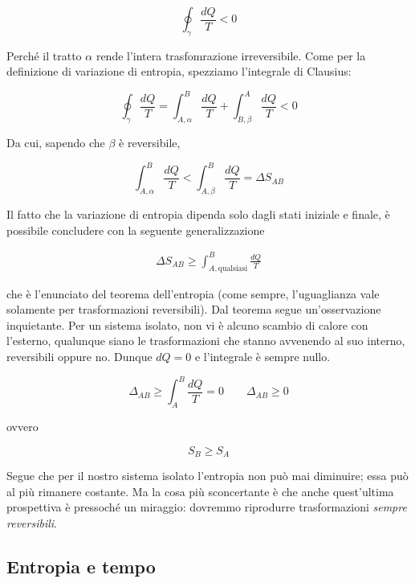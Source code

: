 \[ \oint_\gamma \frac{dQ}{T} < 0 \]

\noindent Perché il tratto $\alpha$ rende l'intera trasfomrazione irreversibile.
Come per la definizione di variazione di entropia, spezziamo l'integrale
di Clausius:

\[ \oint_\gamma \frac{dQ}{T} = \int_{A,\alpha}^{B} \frac{dQ}{T} + \int_{B,\beta}^{A} \frac{dQ}{T} < 0 \]

\noindent Da cui, sapendo che $\beta$ è reversibile,

\[ \int_{A,\alpha}^{B} \frac{dQ}{T} < \int_{A,\beta}^{B} \frac{dQ}{T} = \Delta S_{AB} \]

Il fatto che la variazione di entropia dipenda solo dagli stati
iniziale e finale, è possibile concludere con la seguente generalizzazione

\begin{align}
    \Delta S_{AB} \geq \int_{A,\text{qualsiasi}}^{B} \frac{dQ}{T}
\end{align}

\noindent che è l'enunciato del teorema dell'entropia (come sempre,
l'uguaglianza vale solamente per trasformazioni reversibili). Dal
teorema segue un'osservazione inquietante. Per un sistema isolato,
non vi è alcuno scambio di calore con l'esterno, qualunque siano le
trasformazioni che stanno avvenendo al suo interno, reversibili oppure
no. Dunque $dQ = 0$ e l'integrale è sempre nullo.

\[ \Delta_{AB} \geq \int_{A}^{B} \frac{dQ}{T} = 0 \qquad \Delta_{AB} \geq 0 \]

\noindent ovvero

\[ S_B \geq S_A \]

\noindent Segue che per il nostro sistema isolato l'entropia non può mai
diminuire; essa può al più rimanere costante. Ma la cosa più sconcertante
è che anche quest'ultima prospettiva è pressoché un miraggio: dovremmo
riprodurre trasformazioni \textit{sempre reversibili}.

\subsection*{Entropia e tempo}